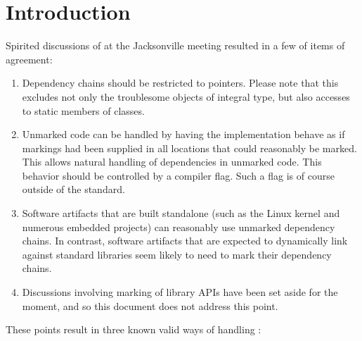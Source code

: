 \documentclass[letterpaper,10pt]{article}
\begin{document}

\section{Introduction}
\label{sec:Introduction}

Spirited discussions of 
at the Jacksonville meeting resulted in a few of items of agreement:

\begin{enumerate}
\item	Dependency chains should be restricted to pointers.
	Please note that this excludes not only the troublesome objects
	of integral type, but also accesses to static members of classes.
\item	Unmarked code can be handled by having the implementation
	behave as if markings had been supplied in all locations that
	could reasonably be marked.
	This allows natural handling of dependencies in unmarked code.
	This behavior should be controlled by a compiler flag.
	Such a flag is of course outside of the standard.
\item	Software artifacts that are built standalone (such as the Linux
	kernel and numerous embedded projects) can reasonably use
	unmarked dependency chains.
	In contrast, software artifacts that are expected to dynamically link
	against standard libraries seem likely to need to mark their
	dependency chains.
\item	Discussions involving marking of library APIs have been
	set aside for the moment, and so this document does not address
	this point.
\end{enumerate}

These points result in three known valid ways of handling
:
\end{document}

